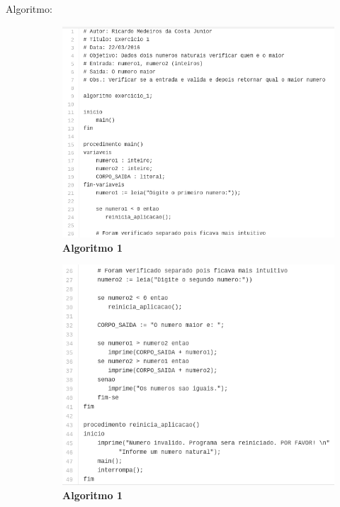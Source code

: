 \documentclass[a4paper, 12pt]{article}
\begin{document}
\begin{enumerate}
\begin{description}
      \item[Algoritmo:]
         \begin{figure}[H]
         \centering
         \includegraphics[width=1\textwidth]{ex1_1}
         \caption[Algoritmo Exercício 1]{\textbf{Algoritmo 1}}
         \end{figure}
         \begin{figure}[H]
         \centering
         \includegraphics[width=1\textwidth]{ex1_2}
         \caption[Algoritmo Exercício 1]{\textbf{Algoritmo 1}}
         \end{figure} 
         


\end{description}
\end{enumerate}
\end{document}
